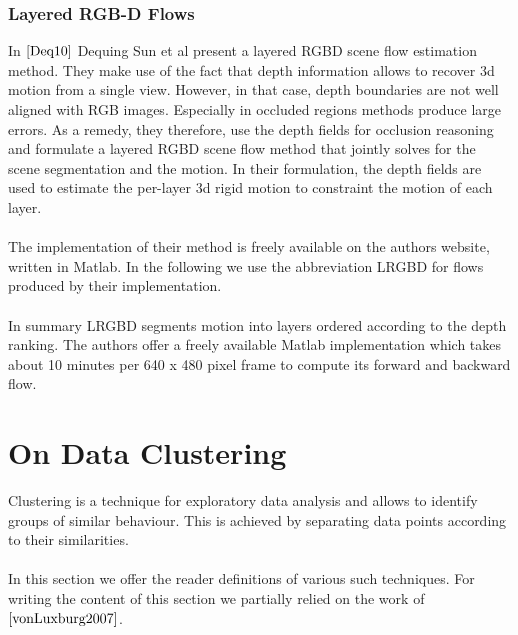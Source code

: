 \subsubsection{Layered RGB-D Flows}
In $\cite{Deq10}$ Dequing Sun et al present a layered RGBD scene flow estimation  method. They make use of the fact that depth information allows to recover 3d motion from a single view. However, in that case, depth boundaries are not well aligned with RGB images. Especially in occluded regions methods produce large errors. As a remedy, they therefore, use the depth fields for occlusion reasoning and formulate a layered RGBD scene flow method that jointly solves for the scene segmentation and the motion. In their formulation, the depth fields are used to estimate the per-layer 3d rigid motion to constraint the motion of each layer. \\ \\
The implementation of their method is freely available on the authors website, written in Matlab. In the following we use the abbreviation LRGBD for flows produced by their implementation. \\ \\
In summary LRGBD segments motion into layers ordered according to the depth ranking. The authors offer a freely available Matlab implementation which takes about 10 minutes per 640 x 480 pixel frame to compute its forward and backward flow.


\section{On Data Clustering}
\label{sec:on_data_clustering}
Clustering is a technique for exploratory data analysis and allows to identify groups of similar behaviour. This is achieved by separating data points according to their similarities. \\ \\
In this section we offer the reader definitions of various such techniques. For writing the content of this section we partially relied on the work of $\cite{vonLuxburg2007}$.

